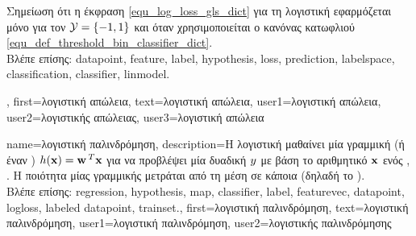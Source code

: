 {{\begin{figure}[H]
\begin{center}
{			\label{fig_logloss_dict} }
		\end{center}
		\end{figure}
		\foreignlanguage{greek}{Σημείωση ότι η έκφραση} \eqref{equ_log_loss_gls_dict} 
		\foreignlanguage{greek}{για τη λογιστική}  \foreignlanguage{greek}{εφαρμόζεται μόνο 
		για τον}  $\mathcal{Y} = \{ -1,1\}$ 
		\foreignlanguage{greek}{και όταν χρησιμοποιείται ο κανόνας κατωφλιού} \eqref{equ_def_threshold_bin_classifier_dict}. 
		\\
		\foreignlanguage{greek}{Βλέπε επίσης:} \gls{datapoint}, \gls{feature}, \gls{label}, \gls{hypothesis}, 
		\gls{loss}, \gls{prediction}, \gls{labelspace}, \gls{classification}, \gls{classifier}, \gls{linmodel}.},
	first={\foreignlanguage{greek}{λογιστική απώλεια}},
	text={\foreignlanguage{greek}{λογιστική απώλεια}},
	user1={\foreignlanguage{greek}{λογιστική απώλεια}}, %
	user2={\foreignlanguage{greek}{λογιστικής απώλειας}}, %
	user3={\foreignlanguage{greek}{λογιστική απώλεια}} %
}

{name={\foreignlanguage{greek}{λογιστική παλινδρόμηση}}, 
	description={\foreignlanguage{greek}{Η λογιστική} 
		 \foreignlanguage{greek}{μαθαίνει μία γραμμική} 
		  (\foreignlanguage{greek}{ή έναν}  
		) $h({\bf x}) = {\bf w}\,^{T} {\bf x}$ 
		\foreignlanguage{greek}{για να προβλέψει μία δυαδική}  $y$ 
		\foreignlanguage{greek}{με βάση το αριθμητικό}  ${\bf x}$ 
		\foreignlanguage{greek}{ενός}  \cite{BishopBook}, \cite{hastie01statisticallearning}. 
		\foreignlanguage{greek}{Η ποιότητα μίας γραμμικής}   
		\foreignlanguage{greek}{μετράται από τη μέση}  \foreignlanguage{greek}{σε κάποια}
		 (\foreignlanguage{greek}{δηλαδή το} ).
		\\
		\foreignlanguage{greek}{Βλέπε επίσης:} \gls{regression}, \gls{hypothesis}, \gls{map}, \gls{classifier}, \gls{label}, \gls{featurevec}, 
		\gls{datapoint}, \gls{logloss}, \gls{labeled datapoint}, \gls{trainset}.},
	first={\foreignlanguage{greek}{λογιστική παλινδρόμηση}},
	text={\foreignlanguage{greek}{λογιστική παλινδρόμηση}},
	user1={\foreignlanguage{greek}{λογιστική παλινδρόμηση}}, %
	user2={\foreignlanguage{greek}{λογιστικής παλινδρόμησης}} %
}

